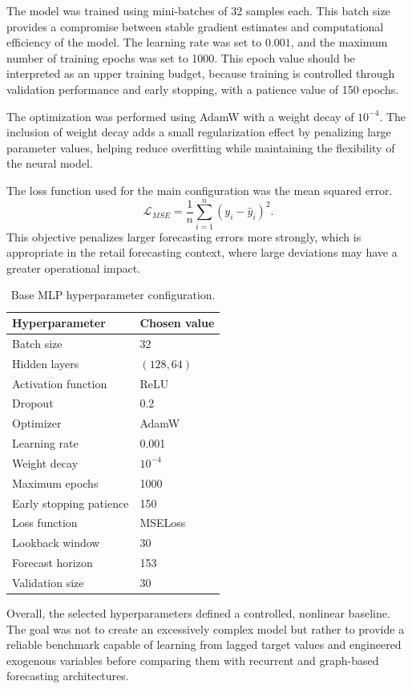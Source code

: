 The model was trained using mini-batches of 32 samples each. This batch size provides a compromise between stable gradient estimates and computational efficiency of the model. The learning rate was set to \(0.001\), and the maximum number of training epochs was set to 1000. This epoch value should be interpreted as an upper training budget, because training is controlled through validation performance and early stopping, with a patience value of 150 epochs.

The optimization was performed using AdamW with a weight decay of \(10^{-4}\). The inclusion of weight decay adds a small regularization effect by penalizing large parameter values, helping reduce overfitting while maintaining the flexibility of the neural model.

The loss function used for the main configuration was the mean squared error.
\[
    \mathcal{L}_{MSE} =
    \frac{1}{n}\sum_{i=1}^{n}(y_i - \hat{y}_i)^2.
\]
This objective penalizes larger forecasting errors more strongly, which is appropriate in the retail forecasting context, where large deviations may have a greater operational impact.

\begin{table}[H]
\centering
\caption{Base MLP hyperparameter configuration.}
\label{tab:mlp_hyperparameters}
\begin{tabular}{ll}
\hline
\textbf{Hyperparameter} & \textbf{Chosen value} \\
\hline
Batch size & 32 \\
Hidden layers & $(128, 64)$ \\
Activation function & ReLU \\
Dropout & 0.2 \\
Optimizer & AdamW \\
Learning rate & 0.001 \\
Weight decay & $10^{-4}$ \\
Maximum epochs & 1000 \\
Early stopping patience & 150 \\
Loss function & MSELoss \\
Lookback window & 30 \\
Forecast horizon & 153 \\
Validation size & 30 \\
\hline
\end{tabular}
\end{table}

Overall, the selected hyperparameters defined a controlled, nonlinear baseline. The goal was not to create an excessively complex model but rather to provide a reliable benchmark capable of learning from lagged target values and engineered exogenous variables before comparing them with recurrent and graph-based forecasting architectures.
